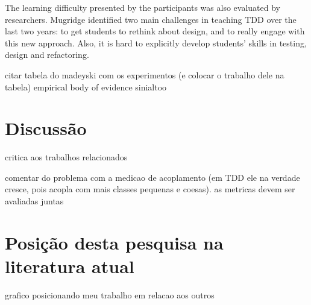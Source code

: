 The learning difficulty presented by the participants was also evaluated by
researchers. Mugridge \cite{mugridge} identified two main challenges in
teaching TDD over the last two years: to get students to rethink about design, 
and to really engage with this new approach. Also, it is
hard to explicitly develop students' skills in testing, design and refactoring.

citar tabela do madeyski com os experimentos (e colocar o trabalho dele na
tabela)
empirical body of evidence sinialtoo \cite{tdd-body-of-evidence}



\section{Discussão}
critica aos trabalhos relacionados

comentar do problema com a medicao de acoplamento (em TDD ele na verdade cresce, pois acopla com mais classes pequenas e coesas).
as metricas devem ser avaliadas juntas

\section{Posição desta pesquisa na literatura atual}

grafico posicionando meu trabalho em relacao aos outros
